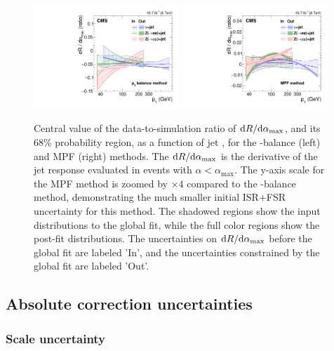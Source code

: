 \documentclass[11pt,twoside,a4paper,cmspaper,final,collab]{cms-tdr}
\begin{document}
\begin{figure}[htbp!]
\begin{center}
\includegraphics[width=0.49\textwidth]{Figure_025-a.pdf}
\includegraphics[width=0.49\textwidth]{Figure_025-b.pdf}
\caption{\label{fig:kfsr_gfit}Central value of the data-to-simulation ratio of $\mathrm{d} R/\mathrm{d} \alpha_\text{max}$, and its 68\% probability region, as a function of jet \pt, for the \pt-balance (left) and MPF (right) methods. The $\mathrm{d} R/\mathrm{d} \alpha_\text{max}$ is the derivative of the jet response evaluated in events with $\alpha<\alpha_\text{max}$. The y-axis scale for the MPF method is zoomed by ${\times} 4$ compared to the \pt-balance method, demonstrating the much smaller initial ISR+FSR uncertainty for this method. The shadowed regions show
the input distributions to the global fit, while the full color regions show the post-fit distributions. The uncertainties on $\mathrm{d} R/\mathrm{d} \alpha_\text{max}$ before the global fit are labeled 'In', and the uncertainties constrained by the global fit are labeled 'Out'.}
\end{center}
\end{figure}

 \subsection{Absolute correction uncertainties}
\label{sec:l3res_globalfit_unc}

\subsubsection*{Scale uncertainty}
\end{document}
